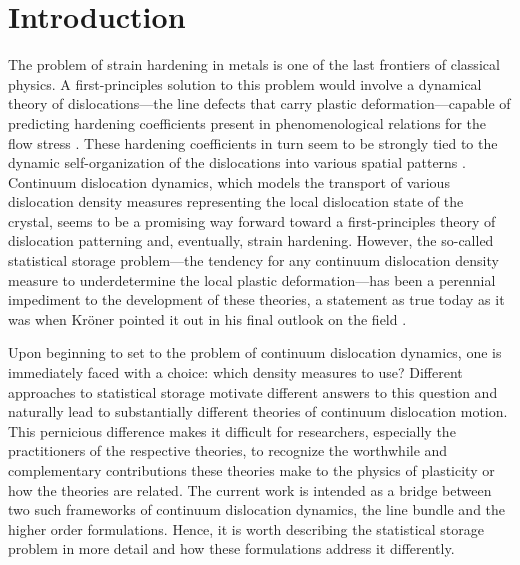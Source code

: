 \section{Introduction}
The problem of strain hardening in metals is one of the last frontiers of classical physics. A first-principles solution to this problem would involve a dynamical theory of dislocations---the line defects that carry plastic deformation---capable of predicting hardening coefficients present in phenomenological relations for the flow stress \cite{kocksPhysicsPhenomenologyStrain2003}. These hardening coefficients in turn seem to be strongly tied to the dynamic self-organization of the dislocations into various spatial patterns \cite{sauzayScalingLawsDislocation2011}. Continuum dislocation dynamics, which models the transport of various dislocation density measures representing  the local dislocation state of the crystal, seems to be a promising way forward toward a first-principles theory of dislocation patterning and, eventually, strain hardening. However, the so-called statistical storage problem—the tendency for any continuum dislocation density measure to underdetermine the local plastic deformation—has been a perennial impediment to the development of these theories, a statement as true today as it was when Kr\"{o}ner pointed it out in his final outlook on the field \cite{Kroner2001}. 

Upon beginning to set to the problem of continuum dislocation dynamics, one is immediately faced with a choice: which density measures to use? Different approaches to statistical storage motivate different answers to this question and naturally lead to substantially different theories of continuum dislocation motion.
This pernicious difference makes it difficult for researchers, especially the practitioners of the respective theories, to recognize the worthwhile and complementary contributions these theories make to the physics of plasticity or how the theories are related. The current work is intended as a bridge between two such frameworks of continuum dislocation dynamics, the line bundle  \cite{andersonDislocationCorrelationsContinuum2024} and the higher order  \cite{Hochrainer2015} formulations. Hence, it is worth describing the statistical storage problem in more detail and how these formulations address it differently.


